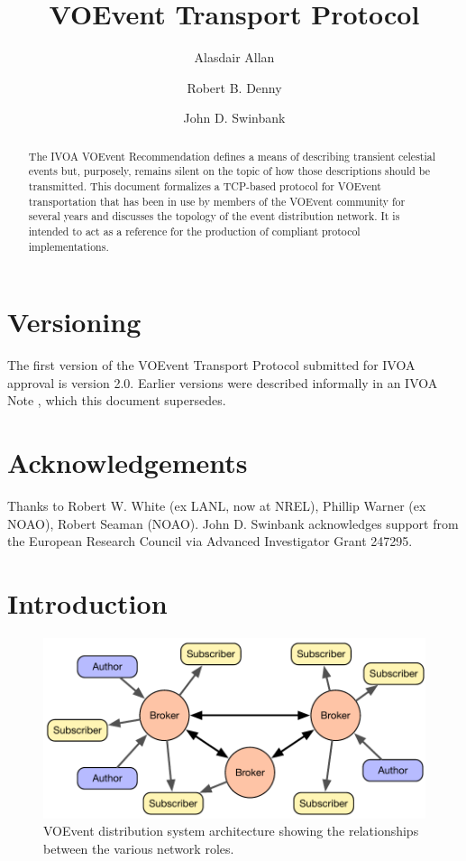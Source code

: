 \documentclass[a4paper,11pt]{ivoa}
\title{VOEvent Transport Protocol}
\author{Alasdair Allan}
\author{Robert B. Denny}
\author{John D. Swinbank}
\begin{document}
\begin{abstract}

The IVOA VOEvent Recommendation \citep{std:VOEVENT2} defines a means of
describing transient celestial events but, purposely, remains silent on the
topic of how those descriptions should be transmitted. This document
formalizes a TCP-based protocol for VOEvent transportation that has been in
use by members of the VOEvent community for several years and discusses the
topology of the event distribution network. It is intended to act as a
reference for the production of compliant protocol implementations.

\end{abstract}

\section*{Versioning}

The first version of the VOEvent Transport Protocol submitted for IVOA
approval is version 2.0. Earlier versions were described informally in an IVOA
Note \citep{Allan:2009}, which this document supersedes.

\section*{Acknowledgements}

Thanks to Robert W. White (ex LANL, now at NREL), Phillip Warner (ex NOAO),
Robert Seaman (NOAO). John D. Swinbank acknowledges support from the European
Research Council via Advanced Investigator Grant 247295.

\section{Introduction}
\label{sec:intro}

\begin{figure}
  \begin{center}
  \includegraphics{figures/network.pdf}
  \end{center}

  \caption{VOEvent distribution system architecture showing the relationships
  between the various network roles.}

  \label{fig:network}
\end{figure}
\end{document}
